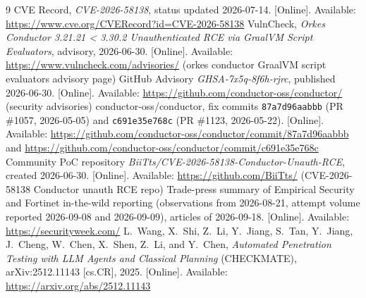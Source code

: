\documentclass[journal]{IEEEtran}
\begin{document}
{\small
\begin{thebibliography}{9}
CVE Record, \textit{CVE-2026-58138}, status updated 2026-07-14. [Online].
Available: \url{https://www.cve.org/CVERecord?id=CVE-2026-58138}
VulnCheck, \textit{Orkes Conductor 3.21.21 \textless{} 3.30.2
Unauthenticated RCE via GraalVM Script Evaluators}, advisory, 2026-06-30.
[Online]. Available: \url{https://www.vulncheck.com/advisories/} (orkes
conductor GraalVM script evaluators advisory page)
GitHub Advisory \textit{GHSA-7x5q-8f6h-rjrc}, published 2026-06-30. [Online].
Available: \url{https://github.com/conductor-oss/conductor/} (security
advisories)
conductor-oss/conductor, fix commits \texttt{87a7d96aabbb} (PR \#1057,
2026-05-05) and \texttt{c691e35e768c} (PR \#1123, 2026-05-22). [Online].
Available:
\url{https://github.com/conductor-oss/conductor/commit/87a7d96aabbb} and
\url{https://github.com/conductor-oss/conductor/commit/c691e35e768c}
Community PoC repository \textit{BiiTts/CVE-2026-58138-Conductor-Unauth-RCE},
created 2026-06-30. [Online]. Available:
\url{https://github.com/BiiTts/} (CVE-2026-58138 Conductor unauth RCE repo)
Trade-press summary of Empirical Security and Fortinet in-the-wild reporting
(observations from 2026-08-21, attempt volume reported 2026-09-08 and
2026-09-09), articles of 2026-09-18. [Online]. Available:
\url{https://securityweek.com/}
L.~Wang, X.~Shi, Z.~Li, Y.~Jiang, S.~Tan, Y.~Jiang, J.~Cheng, W.~Chen,
X.~Shen, Z.~Li, and Y.~Chen, \textit{Automated Penetration Testing with LLM
Agents and Classical Planning} (CHECKMATE), arXiv:2512.11143 [cs.CR], 2025.
[Online]. Available: \url{https://arxiv.org/abs/2512.11143}
\end{thebibliography}
}
\end{document}
